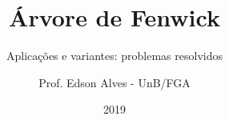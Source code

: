 \title{Árvore de Fenwick}
\subtitle{Aplicações e variantes: problemas resolvidos}
\author{Prof. Edson Alves - UnB/FGA}
\date{2019}
